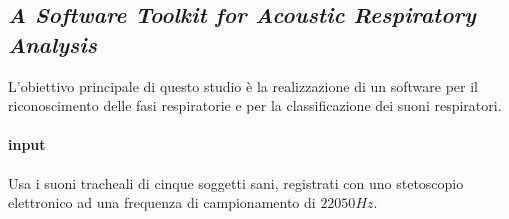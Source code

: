 \begin{frame}
% 
% 
% 
% 
% 
%     
% 
% 


\subsection[A Software Toolkit for Acoustic Respiratory Analysis]{ \textit{A Software Toolkit for Acoustic Respiratory Analysis} \cite{ASTFARA}}

  L'obiettivo principale di questo studio \`e la realizzazione di un software per il riconoscimento delle fasi respiratorie e per la classificazione dei suoni respiratori.
  \paragraph{input}
    Usa i suoni tracheali di cinque soggetti sani, registrati con uno stetoscopio elettronico ad una frequenza di campionamento di $22050Hz$.

\end{frame}
